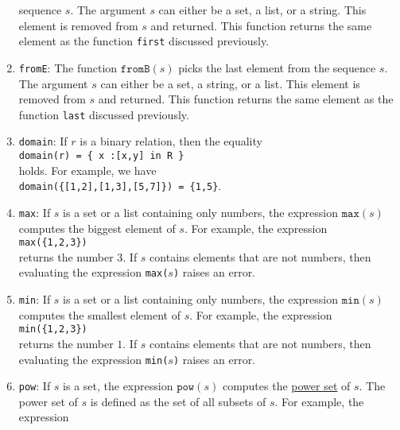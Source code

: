 \begin{enumerate}
      sequence $s$.  The argument $s$ can either be a set, a list, or a string.  This
      element is 
      removed from $s$ and returned.  This function returns the same element as the
      function \texttt{first} discussed previously.
\item \texttt{fromE}: The function $\texttt{fromB}(s)$ picks the last element from the
      sequence $s$.  The argument $s$ can either be a set, a string, or a list.  This element is
      removed from $s$ and returned.  This function returns the same element as the
      function \texttt{last} discussed previously.
\item \texttt{domain}: If $r$ is a binary relation, then the equality
      \\[0.2cm]
      \hspace*{1.3cm}
      \texttt{domain(r) = \{ x :[x,y] in R \}}
      \\[0.2cm]
      holds.  For example, we have
      \\[0.2cm]
      \hspace*{1.3cm}
      \texttt{domain(\{[1,2],[1,3],[5,7]\}) = \{1,5\}}.
\item \texttt{max}:  If $s$ is a set or a list containing only numbers, the expression $\mathtt{max}(s)$ computes the biggest
      element of $s$.  For example, the expression
      \\[0.2cm]
      \hspace*{1.3cm}
      \texttt{max(\{1,2,3\})}
      \\[0.2cm]
      returns the number $3$.  If $s$ contains elements that are not numbers, then evaluating the
      expression \texttt{max($s$)} raises an error.
\item \texttt{min}:  If $s$ is a set or a list containing only numbers, the expression $\mathtt{min}(s)$ computes the smallest
      element of $s$.  For example, the expression
      \\[0.2cm]
      \hspace*{1.3cm}
      \texttt{min(\{1,2,3\})}
      \\[0.2cm]
      returns the number $1$.  If $s$ contains elements that are not numbers, then evaluating the
      expression \texttt{min($s$)} raises an error.
\item \texttt{pow}:  If $s$ is a set, the expression $\mathtt{pow}(s)$ computes the 
      \href{https://en.wikipedia.org/wiki/Power_set}{power set} of $s$.  The power set of $s$ is
      defined as the set of all subsets of $s$.  For example, the expression
      \\[0.2cm]

\end{enumerate}

